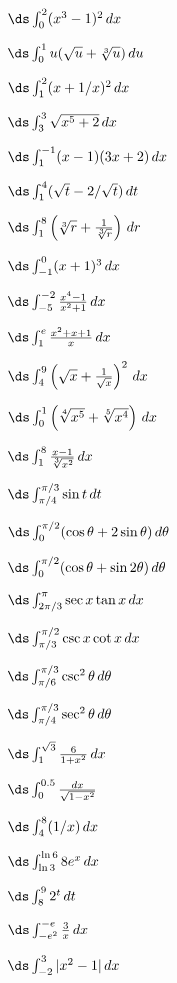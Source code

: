 \begin{multicols}{2}
  \problem$\ds \int^2_0 (x^3-1)^2 \,dx$


  \problem$\ds \int^1_0 u(\sqrt{u}+{\root 3 \of u}) \,du$


  \problem$\ds \int^2_{1} (x+1/x)^2 \,dx$


  \problem$\ds \int^3_{3} \sqrt{x^5+2} \,dx$


  \problem$\ds \int^{-1}_1 (x-1)(3x+2) \,dx$


  \problem$\ds \int^{4}_1 (\sqrt{t}-2/\sqrt{t}) \,dt$


  \problem$\ds \int^{8}_1 \left({\root 3\of r}+\frac{1}{ {\root 3 \of
  r}}\right) \,dr$


  \problem$\ds \int^{0}_{-1} (x+1)^3 \,dx$


  \problem$\ds \int^{-2}_{-5} \frac{x^4-1}{ x^2+1} \,dx$


  \problem$\ds \int^e_{1} \frac{x^2+x+1}{ x} \,dx$


  \problem$\ds \int^9_{4} \left(\sqrt{x}+\frac{1}{ \sqrt{x}}\right)^2 \,dx$


  \problem$\ds \int^1_{0} \left({\root 4\of {x^5}}+{\root 5\of {x^4}}\right)
  \,dx$


  \problem$\ds \int^8_{1} \frac{x-1}{ {\root 3\of {x^2}}} \,dx$


  \problem$\ds \int^{\pi/3}_{\pi/4} \sin t \,dt$


  \problem$\ds \int^{\pi/2}_0 (\cos \theta + 2\sin \theta) \,d\theta$


  \problem$\ds \int^{\pi/2}_0 (\cos \theta + \sin 2\theta) \,d\theta$


  \problem$\ds \int^{\pi}_{2\pi/3} \sec x\tan x \,dx$


  \problem$\ds \int^{\pi/2}_{\pi/3} \csc x\cot x \,dx$


  \problem$\ds \int^{\pi/3}_{\pi/6} \csc^2 \theta \,d\theta$


  \problem$\ds \int^{\pi/3}_{\pi/4} \sec^2 \theta \,d\theta$


  \problem$\ds \int^{\sqrt{3}}_{1} \frac{6}{ {1+x^2}} \,dx$


  \problem$\ds \int^{0.5}_{0} \frac{dx}{ \sqrt{1-x^2}}$


  \problem$\ds \int^{8}_{4} (1/x) \,dx$


  \problem$\ds \int^{\ln 6}_{\ln 3} 8e^x \,dx$


  \problem$\ds \int^{9}_{8} 2^t \,dt$


  \problem$\ds \int^{-e}_{-e^2} \frac{3}{ x} \,dx$


  \problem$\ds \int^3_{-2} |x^2-1| \,dx$



\end{multicols}
